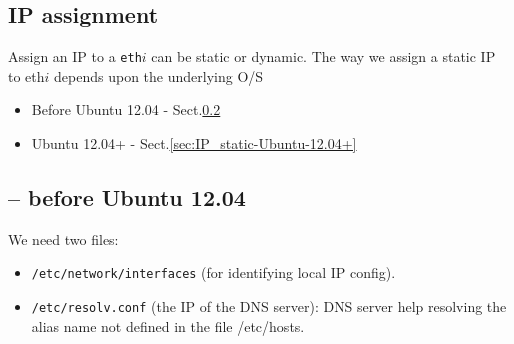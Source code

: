 \subsection{IP assignment}
\label{sec:IP-assignment}
\label{sec:IP_static}

Assign an IP to a \verb!eth!$i$ can be static or dynamic. 
The way we assign a static IP to eth$i$ depends upon the underlying O/S
\begin{itemize}
  \item Before Ubuntu 12.04 - Sect.\ref{sec:IP_static-Ubuntu-12.04-before}
  
  \item Ubuntu 12.04+ - Sect.\ref{sec:IP_static-Ubuntu-12.04+}
\end{itemize}


\subsection{-- before Ubuntu 12.04}
\label{sec:IP_static-Ubuntu-12.04-before}

We need two files:
\begin{itemize}
\item \verb!/etc/network/interfaces! (for identifying local IP config). 

\item \verb!/etc/resolv.conf! (the IP of the DNS server): DNS server help
resolving the alias name not defined in the file /etc/hosts.

\end{itemize}

